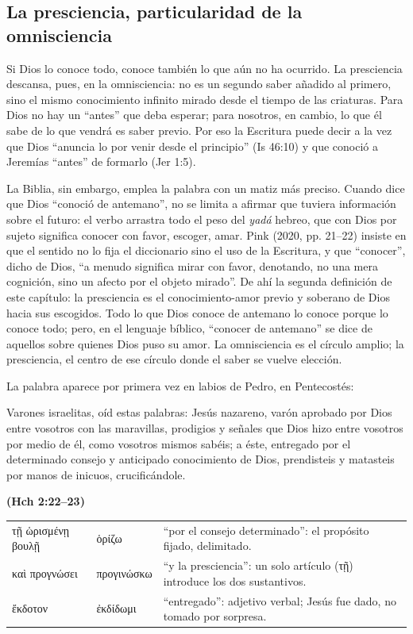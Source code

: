 \documentclass[11pt,letterpaper]{article}
\newcommand{\grc}[1]{\foreignlanguage{ancientgreek}{#1}}
\newcommand{\fuente}[1]{\par\hfill{\upshape\bfseries\small\textcolor{azul}{#1}}}
\begin{document}
\subsection{La presciencia, particularidad de la omnisciencia}
Si Dios lo conoce todo, conoce también lo que aún no ha ocurrido. La presciencia descansa, pues, en la omnisciencia: no es un segundo saber añadido al primero, sino el mismo conocimiento infinito mirado desde el tiempo de las criaturas. Para Dios no hay un ``antes'' que deba esperar; para nosotros, en cambio, lo que él sabe de lo que vendrá es saber previo. Por eso la Escritura puede decir a la vez que Dios ``anuncia lo por venir desde el principio'' (Is 46:10) y que conoció a Jeremías ``antes'' de formarlo (Jer 1:5).

La Biblia, sin embargo, emplea la palabra con un matiz más preciso. Cuando dice que Dios ``conoció de antemano'', no se limita a afirmar que tuviera información sobre el futuro: el verbo arrastra todo el peso del \emph{yadá} hebreo, que con Dios por sujeto significa conocer con favor, escoger, amar. Pink (2020, pp. 21--22) insiste en que el sentido no lo fija el diccionario sino el uso de la Escritura, y que ``conocer'', dicho de Dios, ``a menudo significa mirar con favor, denotando, no una mera cognición, sino un afecto por el objeto mirado''. De ahí la segunda definición de este capítulo: la presciencia es el conocimiento-amor previo y soberano de Dios hacia sus escogidos. Todo lo que Dios conoce de antemano lo conoce porque lo conoce todo; pero, en el lenguaje bíblico, ``conocer de antemano'' se dice de aquellos sobre quienes Dios puso su amor. La omnisciencia es el círculo amplio; la presciencia, el centro de ese círculo donde el saber se vuelve elección.

La palabra aparece por primera vez en labios de Pedro, en Pentecostés:

\begin{cita}Varones israelitas, oíd estas palabras: Jesús nazareno, varón aprobado por Dios entre vosotros con las maravillas, prodigios y señales que Dios hizo entre vosotros por medio de él, como vosotros mismos sabéis; a éste, entregado por el determinado consejo y anticipado conocimiento de Dios, prendisteis y matasteis por manos de inicuos, crucificándole.\fuente{(Hch 2:22--23)}\end{cita}

\begin{filologia}[Hch 2:23]
\begin{tabular}{@{}L{3.2cm}L{1.6cm}L{10cm}@{}}
\grc{τῇ ὡρισμένῃ βουλῇ} & \grc{ὁρίζω} & ``por el consejo determinado'': el propósito fijado, delimitado. \\[2pt]
\grc{καὶ προγνώσει} & \grc{προγινώσκω} & ``y la presciencia'': un solo artículo (\grc{τῇ}) introduce los dos sustantivos. \\[2pt]
\grc{ἔκδοτον} & \grc{ἐκδίδωμι} & ``entregado'': adjetivo verbal; Jesús fue dado, no tomado por sorpresa. \\
\end{tabular}
\end{filologia}
\end{document}
